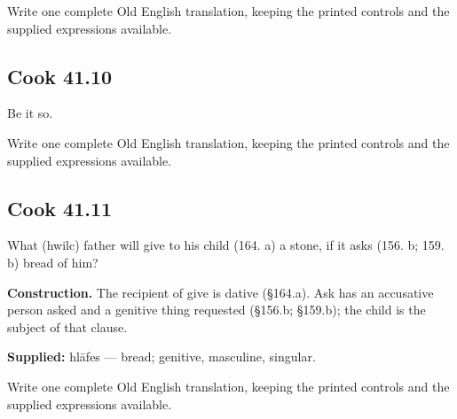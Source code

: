Write one complete Old English translation, keeping the printed controls and the supplied expressions available.

\par\begin{minipage}{\linewidth}\raggedright
\subsection*{Cook 41.10}

Be it so.

Write one complete Old English translation, keeping the printed controls and the supplied expressions available.

\end{minipage}\par\addvspace{4pt}

\par\begin{minipage}{\linewidth}\raggedright
\subsection*{Cook 41.11}

What (hwilc) father will give to his child (164. a) a stone, if it asks (156. b; 159. b) bread of him?

\textbf{Construction.} The recipient of give is dative (§164.a). Ask has an accusative person asked and a genitive thing requested (§156.b; §159.b); the child is the subject of that clause.

\end{minipage}\par\addvspace{4pt}

\textbf{Supplied:} hlāfes — bread; genitive, masculine, singular.

Write one complete Old English translation, keeping the printed controls and the supplied expressions available.

